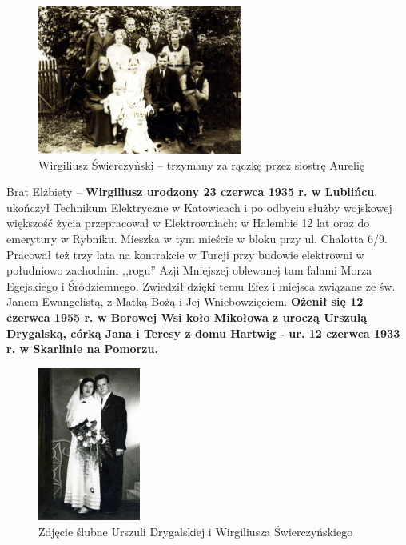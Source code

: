 \begin{figure}[!h]
\begin{center}
\includegraphics[width=0.6\textwidth]{photo/wirgiliusz_swierczynski_1.jpg}
\caption{Wirgiliusz Świerczyński -- trzymany za rączkę przez siostrę Aurelię}
\label{rys:wirgiliusz_swierczynski_1}
\end{center}
\end{figure}

Brat Elżbiety -- \textbf{Wirgiliusz urodzony 23 czerwca 1935 r. w Lublińcu}, ukończył Technikum Elektryczne w Katowicach i po odbyciu służby wojskowej większość życia przepracował w Elektrowniach: w Halembie 12 lat oraz do emerytury w Rybniku. Mieszka w tym mieście w bloku przy ul. Chalotta 6/9. Pracował też trzy lata na kontrakcie w Turcji przy budowie elektrowni w południowo zachodnim ,,rogu'' Azji Mniejszej oblewanej tam falami Morza Egejskiego i Śródziemnego. Zwiedził dzięki temu Efez i miejsca związane ze św. Janem Ewangelistą, z Matką Bożą i Jej Wniebowzięciem. \textbf{Ożenił się 12 czerwca 1955 r. w Borowej Wsi koło Mikołowa z uroczą Urszulą Drygalską, córką Jana i Teresy z domu Hartwig - ur. 12 czerwca 1933 r. w Skarlinie na Pomorzu.}

\begin{figure}[!h]
\begin{center}
\includegraphics[width=0.3\textwidth]{photo/wirgiliusz_urszula_swierczynscy.jpg}
\caption{Zdjęcie ślubne  Urszuli Drygalskiej i Wirgiliusza Świerczyńskiego}
\label{rys:wirgiliusz_urszula_swierczynscy}
\end{center}
\end{figure}

